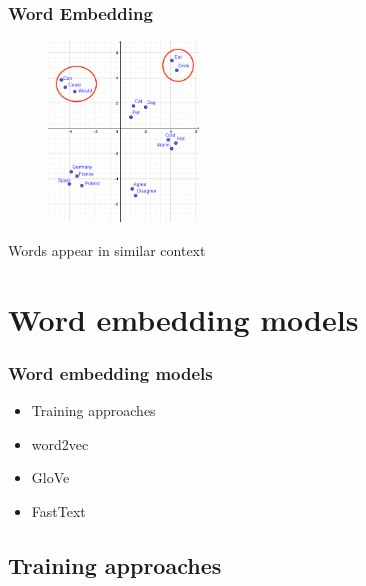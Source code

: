 

\begin{frame}
	\frametitle{Word Embedding}

	\begin{figure}
		\includegraphics[width=4cm]{./figures/Group_context}
	\end{figure}
		\begin{center}
		{Words appear in similar context}
		\end{center}
	\vspace{-0.5cm}

\end{frame}


\section{Word embedding models}


\begin{frame}
\frametitle{Word embedding models}

	\begin{itemize}
		\item Training approaches
		\item word2vec
		\item GloVe
		\item FastText
	\end{itemize}

\end{frame}

\subsection{Training approaches}

